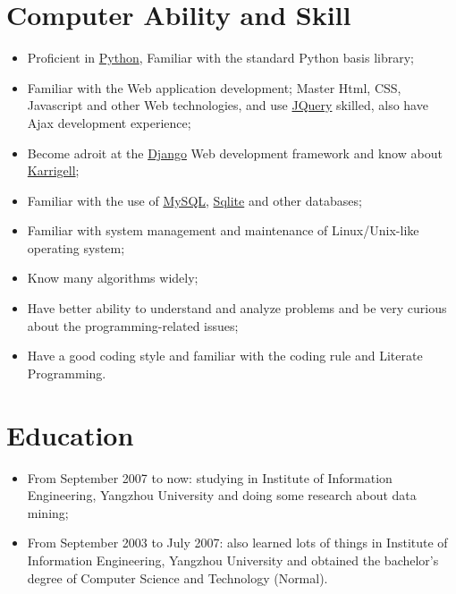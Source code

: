 \documentclass[a4paper,10pt,english]{manual}
\begin{document}
\section{Computer Ability and Skill}
\begin{itemize}

\item {} 
Proficient in \href{http://www.python.org/}{Python}, Familiar with the standard Python basis library;

\item {} 
Familiar with the Web application development; Master Html, CSS, Javascript and other Web technologies, and  use \href{http://jquery.com}{JQuery} skilled, also have Ajax development experience;

\item {} 
Become adroit at the \href{http://www.djangoproject.com/}{Django} Web development framework and know about \href{http://karrigell.sourceforge.net/}{Karrigell};

\item {} 
Familiar with the use of \href{http://www.mysql.com}{MySQL}, \href{http://www.sqlite.org}{Sqlite} and other databases;

\item {} 
Familiar with system management and maintenance of Linux/Unix-like operating system;

\item {} 
Know many algorithms widely;

\item {} 
Have better ability to understand and analyze problems and be very curious about the programming-related issues;

\item {} 
Have a good coding style and familiar with the coding rule and Literate Programming.

\end{itemize}


\section{Education}
\begin{itemize}
\item {} 
From September 2007 to now: studying in Institute of Information Engineering, Yangzhou University and doing some research about data mining;

\item {} 
From September 2003 to July 2007: also learned lots of things in Institute of Information Engineering, Yangzhou University and obtained the bachelor's degree of Computer Science and Technology (Normal).

\end{itemize}
\end{document}
